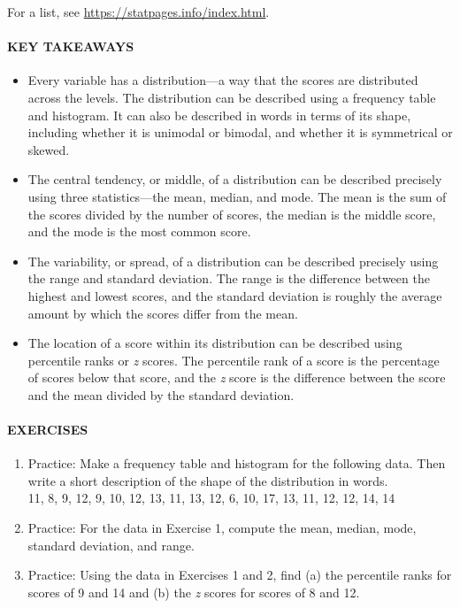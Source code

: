\documentclass[
]{krantz}
\providecommand{\tightlist}{%
  \setlength{\itemsep}{0pt}\setlength{\parskip}{0pt}}
\begin{document}
For a list, see \url{https://statpages.info/index.html}.

\paragraph*{KEY TAKEAWAYS}\label{key-takeaways-32}

\begin{itemize}
\tightlist
\item
  Every variable has a distribution---a way that the scores are distributed across the levels. The distribution can be described using a frequency table and histogram. It can also be described in words in terms of its shape, including whether it is unimodal or bimodal, and whether it is symmetrical or skewed.
\item
  The central tendency, or middle, of a distribution can be described precisely using three statistics---the mean, median, and mode. The mean is the sum of the scores divided by the number of scores, the median is the middle score, and the mode is the most common score.
\item
  The variability, or spread, of a distribution can be described precisely using the range and standard deviation. The range is the difference between the highest and lowest scores, and the standard deviation is roughly the average amount by which the scores differ from the mean.
\item
  The location of a score within its distribution can be described using percentile ranks or \emph{z} scores. The percentile rank of a score is the percentage of scores below that score, and the \emph{z} score is the difference between the score and the mean divided by the standard deviation.
\end{itemize}

\paragraph*{EXERCISES}\label{exercises-26}

\begin{enumerate}
\def\labelenumi{\arabic{enumi}.}
\tightlist
\item
  Practice: Make a frequency table and histogram for the following data. Then write a short description of the shape of the distribution in words.\\
  11, 8, 9, 12, 9, 10, 12, 13, 11, 13, 12, 6, 10, 17, 13, 11, 12, 12, 14, 14
\item
  Practice: For the data in Exercise 1, compute the mean, median, mode, standard deviation, and range.
\item
  Practice: Using the data in Exercises 1 and 2, find (a) the percentile ranks for scores of 9 and 14 and (b) the \emph{z} scores for scores of 8 and 12.
\end{enumerate}
\end{document}
